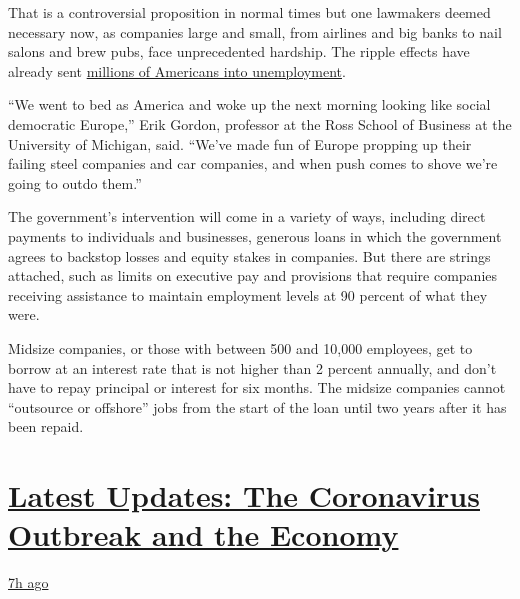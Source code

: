 That is a controversial proposition in normal times but one lawmakers
deemed necessary now, as companies large and small, from airlines and
big banks to nail salons and brew pubs, face unprecedented hardship. The
ripple effects have already sent
\href{https://www.nytimes3xbfgragh.onion/2020/03/26/business/economy/coronavirus-unemployment-claims.html}{millions
of Americans into unemployment}.

``We went to bed as America and woke up the next morning looking like
social democratic Europe,'' Erik Gordon, professor at the Ross School of
Business at the University of Michigan, said. ``We've made fun of Europe
propping up their failing steel companies and car companies, and when
push comes to shove we're going to outdo them.''

The government's intervention will come in a variety of ways, including
direct payments to individuals and businesses, generous loans in which
the government agrees to backstop losses and equity stakes in companies.
But there are strings attached, such as limits on executive pay and
provisions that require companies receiving assistance to maintain
employment levels at 90 percent of what they were.

Midsize companies, or those with between 500 and 10,000 employees, get
to borrow at an interest rate that is not higher than 2 percent
annually, and don't have to repay principal or interest for six months.
The midsize companies cannot ``outsource or offshore'' jobs from the
start of the loan until two years after it has been repaid.

\hypertarget{latest-updates-the-coronavirus-outbreak-and-the-economy}{%
\section{\texorpdfstring{\href{https://www.nytimes3xbfgragh.onion/live/2020/08/17/business/stock-market-today-coronavirus?action=click\&pgtype=Article\&state=default\&region=MAIN_CONTENT_1\&context=storylines_live_updates}{Latest
Updates: The Coronavirus Outbreak and the
Economy}}{Latest Updates: The Coronavirus Outbreak and the Economy}}\label{latest-updates-the-coronavirus-outbreak-and-the-economy}}

\href{https://www.nytimes3xbfgragh.onion/live/2020/08/17/business/stock-market-today-coronavirus?action=click\&pgtype=Article\&state=default\&region=MAIN_CONTENT_1\&context=storylines_live_updates\#robinhood-a-stock-trading-app-is-valued-at-11-2-billion-in-its-latest-funding-round}{7h
ago}

